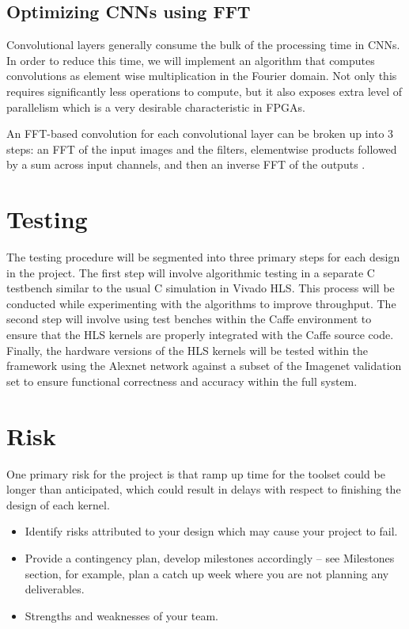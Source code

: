 \documentclass[conference,compsoc]{IEEEtran/IEEEtran}
\begin{document}
\begin{itemize}
\subsection{Optimizing CNNs using FFT}
Convolutional layers generally consume the bulk of the processing time in CNNs. In order to reduce this time, we will implement an algorithm that computes convolutions as element wise multiplication in the Fourier domain. Not only this requires significantly less operations to compute, but it also exposes extra level of parallelism which is a very desirable characteristic in FPGAs.  

An FFT-based convolution for each convolutional layer can be broken up into $3$ steps: an FFT of the input images and the filters, elementwise products followed by a sum across input channels, and then an inverse FFT of the outputs \cite{FFT1}.


\section{Testing}
The testing procedure will be segmented into three primary steps for each design in the project. 
The first step will involve algorithmic testing in a separate C testbench similar to the usual C 
simulation in Vivado HLS. This process will be conducted while experimenting with the algorithms 
to improve throughput. The second step will involve using test benches within the Caffe environment 
to ensure that the HLS kernels are properly integrated with the Caffe source code. Finally, the 
hardware versions of the HLS kernels will be tested within the framework using the Alexnet network 
against a subset of the Imagenet validation set to ensure functional correctness and accuracy 
within the full system. 

\section{Risk}

One primary risk for the project is that ramp up time for the toolset could be longer than 
anticipated, which could result in delays with respect to finishing the design of each kernel. 

\begin{itemize}
\item Identify risks attributed to your design which may cause your project to fail.
\item Provide a contingency plan, develop milestones accordingly -- see Milestones section, for example, plan a catch up week where you are not planning any deliverables.
\item Strengths and weaknesses of your team.
\end{itemize}



\end{itemize}
\end{document}
